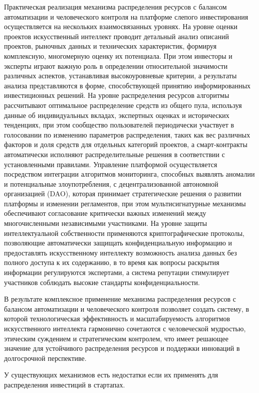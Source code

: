 \documentclass[
    14pt,
    specialist,
    candidate, %
    subf, %
    href,
    dotsinheaders=false
]{disser}
\begin{document}
Практическая реализация механизма распределения ресурсов с балансом автоматизации и человеческого контроля на платформе слепого инвестирования осуществляется на нескольких взаимосвязанных уровнях. На уровне оценки проектов искусственный интеллект проводит детальный анализ описаний проектов, рыночных данных и технических характеристик, формируя комплексную, многомерную оценку их потенциала. При этом инвесторы и эксперты играют важную роль в определении относительной значимости различных аспектов, устанавливая высокоуровневые критерии, а результаты анализа представляются в форме, способствующей принятию информированных инвестиционных решений. На уровне распределения ресурсов алгоритмы рассчитывают оптимальное распределение средств из общего пула, используя данные об индивидуальных вкладах, экспертных оценках и исторических тенденциях, при этом сообщество пользователей периодически участвует в голосовании по изменению параметров распределения, таких как вес различных факторов и доля средств для отдельных категорий проектов, а смарт-контракты автоматически исполняют распределительные решения в соответствии с установленными правилами. Управление платформой осуществляется посредством интеграции алгоритмов мониторинга, способных выявлять аномалии и потенциальные злоупотребления, с децентрализованной автономной организацией (DAO), которая принимает стратегические решения о развитии платформы и изменении регламентов, при этом мультисигнатурные механизмы обеспечивают согласование критически важных изменений между многочисленными независимыми участниками. На уровне защиты интеллектуальной собственности применяются криптографические протоколы, позволяющие автоматически защищать конфиденциальную информацию и предоставлять искусственному интеллекту возможность анализа данных без полного доступа к их содержанию, в то время как вопросы раскрытия информации регулируются экспертами, а система репутации стимулирует участников соблюдать высокие стандарты конфиденциальности.

В результате комплексное применение механизма распределения ресурсов с балансом автоматизации и человеческого контроля позволяет создать систему, в которой технологическая эффективность и масштабируемость алгоритмов искусственного интеллекта гармонично сочетаются с человеческой мудростью, этическим суждением и стратегическим контролем, что имеет решающее значение для устойчивого распределения ресурсов и поддержки инноваций в долгосрочной перспективе.

У существующих механизмов есть недостатки если их применять для распределения инвестиций в стартапах.
\end{document}
